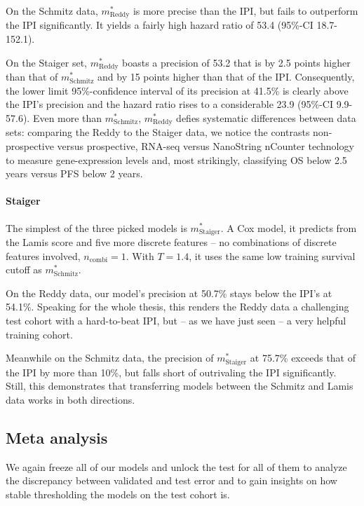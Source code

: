 On the Schmitz data, $m^*_\text{Reddy}$ is more precise than the IPI, but fails to outperform the 
IPI significantly. It yields a fairly high hazard ratio of \num{53.4} 
(\num{95}\%-CI \num{18.7}-\num{152.1}).

On the Staiger set, $m^*_\text{Reddy}$ boasts a precision of \num{53.2} that is by \num{2.5} 
points higher than that of $m^*_\text{Schmitz}$ and by \num{15} points higher than that of the IPI. 
Consequently, the lower limit \num{95}\%-confidence interval of its precision at \num{41.5}\% is 
clearly above the IPI's precision and the hazard ratio rises to a considerable \num{23.9}
(\num{95}\%-CI \num{9.9}-\num{57.6}). Even more than $m^*_\text{Schmitz}$, $m^*_\text{Reddy}$ 
defies systematic differences between data sets: comparing the Reddy to the Staiger data, we 
notice the contrasts non-prospective versus prospective, 
RNA-seq versus NanoString nCounter technology to measure gene-expression levels and, most strikingly, 
classifying OS below \num{2.5} years versus PFS below \num{2} years.

\paragraph{Staiger}
The simplest of the three picked models is $m^*_\text{Staiger}$. A Cox model, it predicts from 
the Lamis score and five more discrete features -- no combinations of discrete features involved, 
$n_\text{combi} = 1$. With $T = \num{1.4}$, it uses the same low training survival cutoff as 
$m^*_\text{Schmitz}$.

On the Reddy data, our model's precision at \num{50.7}\% stays below the IPI's at \num{54.1}\%. 
Speaking for the whole thesis, this renders the Reddy data a challenging test cohort with a 
hard-to-beat IPI, but -- as we have just seen -- a very helpful training cohort.

Meanwhile on the Schmitz data, the precision of $m^*_\text{Staiger}$ at \num{75.7}\% exceeds that 
of the IPI by more than \num{10}\%, but falls short of outrivaling the IPI significantly. Still, 
this demonstrates that transferring models between the Schmitz and Lamis data works in both 
directions.

\subsection{Meta analysis}

We again freeze all of our models and unlock the test for all of them to analyze the discrepancy 
between validated and test error and to gain insights on how stable thresholding the models on the 
test cohort is.

